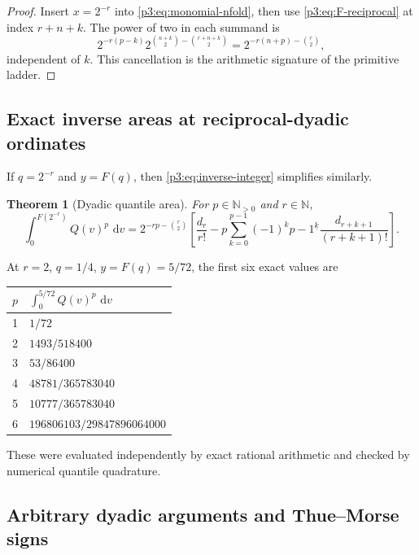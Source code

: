 \documentclass[11pt,oneside]{article}
\newtheorem{theorem}{Theorem}[section]
\theoremstyle{definition}
\theoremstyle{remark}
\newcommand{\N}{\mathbb N}
\newcommand{\dd}{\,\mathrm d}
\newcommand{\fall}[2]{#1^{\underline{#2}}}
\newcommand{\1}{\mathbf 1}
\begin{document}
\begin{proof}
Insert $x=2^{-r}$ into \eqref{p3:eq:monomial-nfold}, then use
\eqref{p3:eq:F-reciprocal} at index $r+n+k$.  The power of two in each summand is
\[
 2^{-r(p-k)}2^{\binom{n+k}{2}-\binom{r+n+k}{2}}
 =2^{-r(n+p)-\binom r2},
\]
independent of $k$.  This cancellation is the arithmetic signature of the primitive ladder.
\end{proof}

\subsection{Exact inverse areas at reciprocal-dyadic ordinates}

If $q=2^{-r}$ and $y=F(q)$, then \eqref{p3:eq:inverse-integer} simplifies similarly.

\begin{theorem}[Dyadic quantile area]
\label{p3:thm:dyadic-inverse-area}
For $p\in\N_{>0}$ and $r\in\N$,
\begin{equation}
 \boxed{
 \int_0^{F(2^{-r})}Q(v)^p\,\dd v
 =2^{-rp-\binom r2}
 \left[
 \frac{d_r}{r!}
 -p\sum_{k=0}^{p-1}(-1)^k\fall{p-1}k
 \frac{d_{r+k+1}}{(r+k+1)!}
 \right].}
 \label{p3:eq:dyadic-inverse-area}
\end{equation}
\end{theorem}

At $r=2$, $q=1/4$, $y=F(q)=5/72$, the first six exact values are
\begin{center}
\begin{tabular}{@{}cl@{}}
\toprule
$p$ & $\displaystyle\int_0^{5/72}Q(v)^p\,\dd v$\\
\midrule
1 & $1/72$\\
2 & $1493/518400$\\
3 & $53/86400$\\
4 & $48781/365783040$\\
5 & $10777/365783040$\\
6 & $196806103/29847896064000$\\
\bottomrule
\end{tabular}
\end{center}
These were evaluated independently by exact rational arithmetic and checked by numerical
quantile quadrature.

\subsection{Arbitrary dyadic arguments and Thue--Morse signs}
\end{document}
